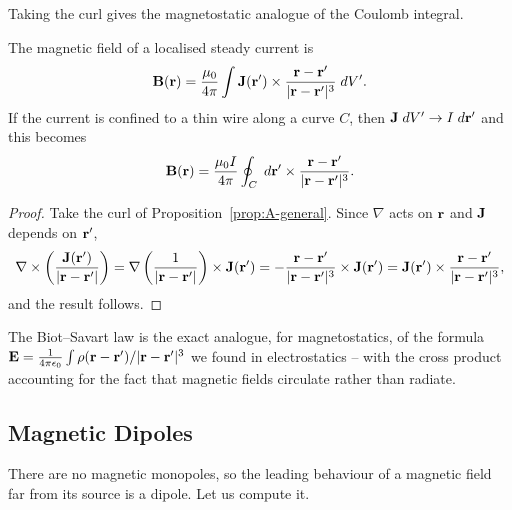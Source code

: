 \documentclass[a4paper]{scrartcl}
\begin{document}
Taking the curl gives the magnetostatic analogue of the Coulomb integral.

\begin{law}
	The magnetic field of a localised steady current is
	$$
	\mathbf{B}(\mathbf{r}) = \frac{\mu_0}{4\pi}\int \mathbf{J}(\mathbf{r}')\times \frac{\mathbf{r}-\mathbf{r}'}{|\mathbf{r}-\mathbf{r}'|^3}\; d V'.
	$$
	If the current is confined to a thin wire along a curve $C$, then $\mathbf{J}\; d V' \to I \; d \mathbf{r}'$ and this becomes
	$$
	\mathbf{B}(\mathbf{r}) = \frac{\mu_0 I}{4\pi}\oint_C \; d \mathbf{r}' \times \frac{\mathbf{r}-\mathbf{r}'}{|\mathbf{r}-\mathbf{r}'|^3}.
	$$
\end{law}
\begin{proof}
	Take the curl of Proposition~\ref{prop:A-general}. Since $\nabla$ acts on $\mathbf{r}$ and $\mathbf{J}$ depends on $\mathbf{r}'$,
	$$
	\nabla\times\left(\frac{\mathbf{J}(\mathbf{r}')}{|\mathbf{r}-\mathbf{r}'|}\right) = \nabla\left(\frac{1}{|\mathbf{r}-\mathbf{r}'|}\right)\times \mathbf{J}(\mathbf{r}') = -\frac{\mathbf{r}-\mathbf{r}'}{|\mathbf{r}-\mathbf{r}'|^3}\times \mathbf{J}(\mathbf{r}') = \mathbf{J}(\mathbf{r}')\times\frac{\mathbf{r}-\mathbf{r}'}{|\mathbf{r}-\mathbf{r}'|^3},
	$$
	and the result follows.
\end{proof}

The Biot--Savart law is the exact analogue, for magnetostatics, of the formula $\mathbf{E} = \frac{1}{4\pi\epsilon_0}\int \rho (\mathbf{r}-\mathbf{r}')/|\mathbf{r}-\mathbf{r}'|^3$ we found in electrostatics -- with the cross product accounting for the fact that magnetic fields circulate rather than radiate.

\subsection{Magnetic Dipoles}

There are no magnetic monopoles, so the leading behaviour of a magnetic field far from its source is a dipole. Let us compute it.
\end{document}
